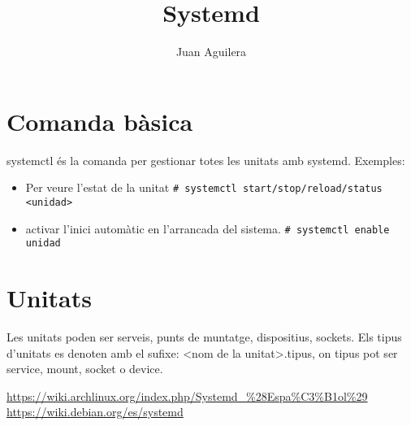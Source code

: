 \documentclass[a4paper]{article}
\begin{document}
\title{Systemd}
\author{Juan Aguilera}
\maketitle

\begin{comment}
oddsidemargin \the\oddsidemargin \newline
textwidth \the\textwidth \newline
marginparsep \the\marginparsep \newline
marginparwidth \the\marginparwidth \newline
hoffset \the\hoffset \newline
paperwidth \the\paperwidth 
\end{comment}

\section{Comanda bàsica}
systemctl és la comanda per gestionar totes les unitats amb systemd. Exemples:
\begin{itemize}
	\item Per veure l'estat de la unitat  \newline
	\verb+# systemctl start/stop/reload/status <unidad>+ 
	\item activar l'inici automàtic en l'arrancada del sistema. \newline
	\verb+# systemctl enable unidad+ 
\end{itemize}

\section{Unitats}

Les unitats poden ser serveis, punts de muntatge, dispositius, sockets. Els tipus d'unitats es denoten amb el sufixe: <nom de la unitat>.tipus, on tipus pot ser service, mount, socket o device.

\begin{thebibliography}{99}
	 \url{https://wiki.archlinux.org/index.php/Systemd_%28Espa%C3%B1ol%29}
	 \url{https://wiki.debian.org/es/systemd}
	
\end{thebibliography}
\end{document}
